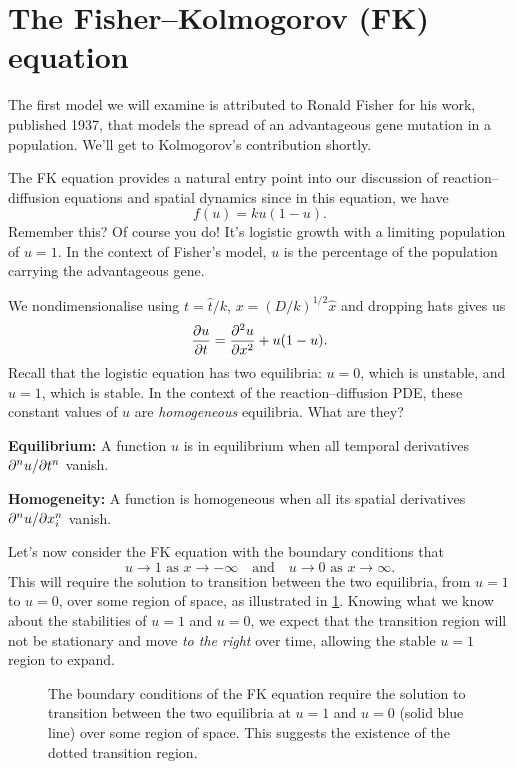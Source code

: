 \documentclass[main.tex]{subfiles}
\begin{document}
\section{The Fisher--Kolmogorov (FK) equation}
The first model we will examine is attributed to Ronald Fisher for his work, published 1937, that models the spread of an advantageous gene mutation in a population. We’ll get to Kolmogorov’s contribution shortly.

The FK equation provides a natural entry point into our discussion of reaction--diffusion equations and spatial dynamics since in this equation, we have
\begin{equation}
	f(u) = ku (1-u).
\end{equation}
Remember this? Of course you do! It's logistic growth with a limiting population of $u=1$. In the context of Fisher’s model, $u$ is the percentage of the population carrying the advantageous gene. 

We nondimensionalise using $t = \hat{t}/k$, $x = (D/k)^{1/2}\hat{x}$ and dropping hats gives us
\begin{equation}
	\label{fk-nondim}
	\pd{u}{t} = \pdd{u}{x} + u(1-u).
\end{equation}
Recall that the logistic equation has two equilibria: $u = 0$, which is unstable, and $u = 1$, which is stable. In the context of the reaction--diffusion PDE, these constant values of $u$ are \emph{homogeneous} equilibria. What are they?

\begin{description}
\item{\textbf{Equilibrium:}} A function $u$ is in equilibrium when all temporal derivatives $\pdn{n}{u}{t}$ vanish.
\item{\textbf{Homogeneity:}} A function is homogeneous when all its spatial derivatives $\pdn{n}{u}{x_i}$ vanish.
\end{description}

Let’s now consider the FK equation with the boundary conditions that
\begin{equation}
	\label{fk-bc}
	u \to 1 \text{ as } x \to -\infty \quad \text{and} \quad u \to 0 \text{ as } x \to \infty.
\end{equation}
This will require the solution to transition between the two equilibria, from $u = 1$ to $u = 0$, over some region of space, as illustrated in \cref{fig:fk-travelling-wave-intuition-1}. Knowing what we know about the stabilities of $u = 1$ and $u = 0$, we expect that the transition region will not be stationary and move \emph{to the right} over time, allowing the stable $u = 1$ region to expand. 
\begin{figure}
\centering

\caption{The boundary conditions of the FK equation require the solution to transition between the two equilibria at $u=1$ and $u=0$ (solid blue line) over some region of space. This suggests the existence of the dotted transition region.}
\label{fig:fk-travelling-wave-intuition-1}
\end{figure}
\end{document}
